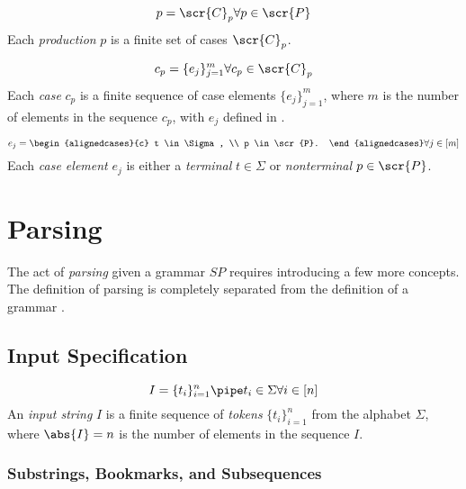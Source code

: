 \documentclass[10pt]{article}
\begin{document}
\begin{equation}
  \label{eq:p}
  p = \scr{C}_p \forall p \in \scr{P}
\end{equation}
Each \textit{production} $p$ is a finite set of cases $\scr{C}_p$.

\begin{equation}
  \label{eq:cp}
  c_p = \{e_j\}_{j=1}^m \forall c_p \in \scr{C}_p
\end{equation}
Each \textit{case} $c_p$ is a finite sequence of case elements $\{e_j\}_{j=1}^m$, where $m$ is the number of elements in the sequence $c_p$, with $e_j$ defined in .

\begin{equation}
  \label{eq:ej}
  e_j = \begin{alignedcases}{c}
    t \in \Sigma, \\
    p \in \scr{P}.
  \end{alignedcases} \forall j \in [m]
\end{equation}
Each \textit{case element} $e_j$ is either a \textit{terminal} $t \in \Sigma$ or \textit{nonterminal} $p \in \scr{P}$.

\section{Parsing}
\label{sec:parsing}
The act of \textit{parsing} given a grammar $SP$ requires introducing a few more concepts. The definition of parsing is completely separated from the definition of a grammar .

\subsection{Input Specification}
\label{sec:input-specification}

\begin{equation}
  \label{eq:input-string-tokens}
  I = \{t_i\}_{i=1}^n \pipe t_i \in \Sigma \forall i \in [n]
\end{equation}
An \textit{input string} $I$ is a finite sequence of \textit{tokens} $\{t_i\}_{i=1}^n$ from the alphabet $\Sigma$, where $\abs{I} = n$ is the number of elements in the sequence $I$.

\subsubsection{Substrings, Bookmarks, and Subsequences}
\label{sec:subsequences}
\end{document}
